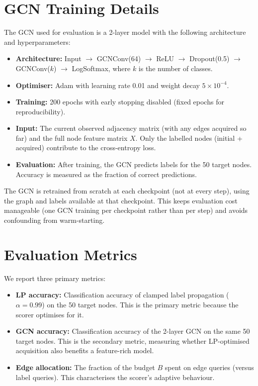 \documentclass[12pt,a4paper,oneside]{report}
\begin{document}
\section{GCN Training Details}

The GCN used for evaluation is a 2-layer model with the following architecture and hyperparameters:

\begin{itemize}[leftmargin=2em]
    \item \textbf{Architecture:} Input $\to$ GCNConv(64) $\to$ ReLU $\to$ Dropout(0.5) $\to$ GCNConv($k$) $\to$ LogSoftmax, where $k$ is the number of classes.
    \item \textbf{Optimiser:} Adam with learning rate 0.01 and weight decay $5 \times 10^{-4}$.
    \item \textbf{Training:} 200 epochs with early stopping disabled (fixed epochs for reproducibility).
    \item \textbf{Input:} The current observed adjacency matrix (with any edges acquired so far) and the full node feature matrix $X$. Only the labelled nodes (initial + acquired) contribute to the cross-entropy loss.
    \item \textbf{Evaluation:} After training, the GCN predicts labels for the 50 target nodes. Accuracy is measured as the fraction of correct predictions.
\end{itemize}

The GCN is retrained from scratch at each checkpoint (not at every step), using the graph and labels available at that checkpoint. This keeps evaluation cost manageable (one GCN training per checkpoint rather than per step) and avoids confounding from warm-starting.

\section{Evaluation Metrics}

We report three primary metrics:

\begin{itemize}[leftmargin=2em]
    \item \textbf{LP accuracy:} Classification accuracy of clamped label propagation ($\alpha = 0.99$) on the 50 target nodes. This is the primary metric because the scorer optimises for it.
    \item \textbf{GCN accuracy:} Classification accuracy of the 2-layer GCN on the same 50 target nodes. This is the secondary metric, measuring whether LP-optimised acquisition also benefits a feature-rich model.
    \item \textbf{Edge allocation:} The fraction of the budget $B$ spent on edge queries (versus label queries). This characterises the scorer's adaptive behaviour.
\end{itemize}
\end{document}

